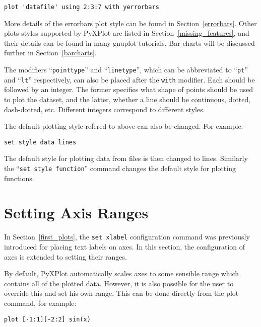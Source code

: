 \documentclass[a4paper,onecolumn,11pt]{book}
\begin{document}
\begin{verbatim}
plot 'datafile' using 2:3:7 with yerrorbars
\end{verbatim}

More details of the errorbars plot style can be found in
Section~\ref{errorbars}. Other plots styles supported by PyXPlot are listed in
Section~\ref{missing_features}, and their details can be found in many gnuplot
tutorials. Bar charts will be discussed further in Section~\ref{barcharts}.

The modifiers ``\texttt{pointtype}'' and ``\texttt{linetype}''\label{pointtype_modifier}, which can be
abbreviated to ``\texttt{pt}'' and ``\texttt{lt}'' respectively, can also be
placed after the \texttt{with} modifier. Each should be followed by an integer.
The former specifies what shape of points should be used to plot the dataset,
and the latter, whether a line should be continuous, dotted, dash-dotted, etc.
Different integers correspond to different styles.

The default plotting style refered to above can also be changed.  For example:

\begin{verbatim}
set style data lines
\end{verbatim}

\noindent The default style for plotting data from files is then changed to
lines.  Similarly the ``{\tt set style function}'' command changes the default style for
plotting functions.

\section{Setting Axis Ranges}

In Section~\ref{first_plots}, the \texttt{set xlabel} configuration command was
previously introduced for placing text labels on axes. In this section, the
configuration of axes is extended to setting their ranges.

By default, PyXPlot automatically scales axes to some sensible range which
contains all of the plotted data. However, it is also possible for the user to
override this and set his own range. This can be
done directly from the plot command, for example:

\begin{verbatim}
plot [-1:1][-2:2] sin(x)
\end{verbatim}
\label{plot_ranges}
\end{document}
